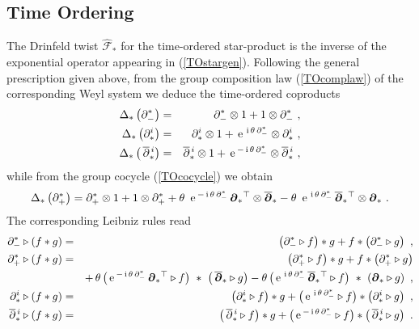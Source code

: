 \documentclass[11pt,a4paper]{article}
\newcommand{\1}{\mathbb{1}}
\newcommand{\mbf}[1]{{\boldsymbol {#1} }}
\def\ii{{\,{\rm i}\,}}
\def\mdell{{\mbf\partial}}
\def\e{{\,\rm e}\,}
\def\bea{\begin{eqnarray}}
\def\eea{\end{eqnarray}}
\newcommand{\beq}{\begin{eqnarray}}
\newcommand{\eeq}{\end{eqnarray}}
\begin{document}
\subsection{Time Ordering \label{TOcoprod}}

The Drinfeld twist $\hat{\mathcal F}_*$ for the time-ordered
star-product is the inverse of the exponential operator appearing in
(\ref{TOstargen}). Following the general prescription given above,
from the group composition law (\ref{TOcomplaw}) of the corresponding
Weyl system we deduce the time-ordered coproducts
\bea
\Delta_*\left(\partial_-^*\right)&=&\partial_-^*\otimes1+
1\otimes\partial_-^* \ , \nonumber\\
\Delta_*\left(\partial^i_*\right)&=&\partial^i_*\otimes1+
\e^{\ii\theta\,\partial_-^*}\otimes\partial^i_* \ , \nonumber\\
\Delta_*\left(\,\overline{\partial}{}^{\,i}_*\right)&=&
\overline{\partial}{}^{\,i}_*\otimes1+\e^{-\ii\theta\,\partial_-^*}
\otimes\overline{\partial}{}^{\,i}_* \ ,
\label{TOcoprods}\eea
while from the group cocycle (\ref{TOcocycle}) we obtain
\beq
\Delta_*\left(\partial_+^*\right)=\partial_+^*\otimes1+
1\otimes\partial_+^*+\theta~\e^{-\ii\theta\,
\partial_-^*}\,\mdell_*{}^\top\otimes\overline{\mdell}_*-\theta~
\e^{\ii\theta\,\partial_-^*}\,
\overline{\mdell}_*{}^\top\otimes\mdell_* \ .
\label{TOcoprodtime}\eeq
The corresponding Leibniz rules read
\bea
\partial_-^*\triangleright(f*g)&=&\left(\partial_-^*\triangleright
f\right)*g+f*\left(\partial_-^*\triangleright g\right) \ , \nonumber\\
\partial_+^*\triangleright(f*g)&=&\left(\partial_+^*\triangleright
f\right)*g+f*\left(\partial_+^*\triangleright g\right)\nonumber\\ &&
+\,\theta\,\bigl(\e^{-\ii\theta\,\partial_-^*}\,\mdell_*{}^\top
\triangleright f\bigr)~*~\left(\,\overline{\mdell}_*
\triangleright g\right)-\theta\,\bigl(\e^{\ii\theta\,\partial_-^*}\,
\overline{\mdell}_*{}^\top
\triangleright f\bigr)~*~\left(\mdell_*\triangleright g\right) \ ,
\nonumber\\ \partial^i_*\triangleright(f*g)&=&\left(\partial^i_*
\triangleright f\right)*g+\bigl(\e^{\ii\theta\,\partial_-^*}
\triangleright f\bigr)*\left(\partial^i_*\triangleright g\right) \ ,
\nonumber\\ \overline{\partial}{}^{\,i}_*
\triangleright(f*g)&=&\left(\,\overline{\partial}{}^{\,i}_*
\triangleright f\right)*g+\bigl(\e^{-\ii\theta\,\partial_-^*}
\triangleright f\bigr)*\left(\,\overline{\partial}{}^{\,i}_*
\triangleright g\right) \ .
\label{TOLeibniz}\eea
\end{document}
